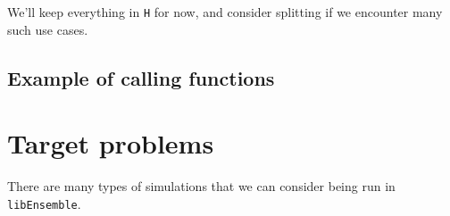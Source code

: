 \documentclass{article}
\newcommand{\libE}{\texttt{libEnsemble}\xspace}
\begin{document}
We'll keep everything in \texttt{H} for now, and consider splitting if we
encounter many such use cases.

\clearpage
\subsection{Example of calling functions}
% 

\clearpage


\clearpage
\section{Target problems}
There are many types of simulations that we can consider being run in \libE.
\end{document}
